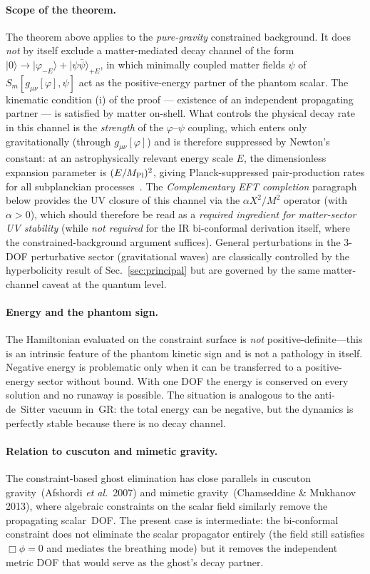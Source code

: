 \documentclass[11pt]{article}
\begin{document}
\paragraph{Scope of the theorem.}
The theorem above applies to the \emph{pure-gravity}
constrained background. It does \emph{not} by itself exclude a
matter-mediated decay channel of the form
$|0\rangle \to |\varphi_{-E}\rangle + |\psi\bar\psi\rangle_{+E}$,
in which minimally coupled matter fields $\psi$ of $S_m[g_{\mu\nu}[\varphi],\psi]$
act as the positive-energy partner of the phantom
scalar. The kinematic condition (i) of the proof --- existence
of an independent propagating partner --- is satisfied by matter
on-shell. What controls the physical decay rate in this channel
is the \emph{strength} of the $\varphi$--$\psi$ coupling, which
enters only gravitationally (through $g_{\mu\nu}[\varphi]$) and is therefore
suppressed by Newton's constant: at an astrophysically relevant
energy scale $E$, the dimensionless expansion parameter is
$(E/M_{\rm Pl})^{2}$, giving Planck-suppressed pair-production
rates for all subplanckian processes~\cite{ArkaniHamed2004}. The
\emph{Complementary EFT completion} paragraph below provides the
UV closure of this channel via the $\alpha X^{2}/M^{2}$ operator
(with $\alpha>0$), which should therefore be read as a
\emph{required ingredient for matter-sector UV stability}
(while \emph{not required} for the IR bi-conformal derivation
itself, where the constrained-background argument suffices).
General perturbations in the 3-DOF perturbative sector
(gravitational waves) are classically controlled by the
hyperbolicity result of Sec.~\ref{sec:principal} but are
governed by the same matter-channel caveat at the quantum
level.

\paragraph{Energy and the phantom sign.}
The Hamiltonian evaluated on the constraint surface is \emph{not} positive-definite---this is an intrinsic feature of the phantom kinetic sign and is not a pathology in itself.  Negative energy is problematic only when it can be transferred to a positive-energy sector without bound.  With one DOF the energy is conserved on every solution and no runaway is possible.  The situation is analogous to the anti-de~Sitter vacuum in~GR: the total energy can be negative, but the dynamics is perfectly stable because there is no decay channel.

\paragraph{Relation to cuscuton and mimetic gravity.}
The constraint-based ghost elimination has close parallels in cuscuton gravity~(Afshordi \textit{et al.}\ 2007) and mimetic gravity~(Chamseddine \& Mukhanov 2013), where algebraic constraints on the scalar field similarly remove the propagating scalar~DOF.  The present case is intermediate: the bi-conformal constraint does not eliminate the scalar propagator entirely (the field still satisfies $\Box\phi=0$ and mediates the breathing mode) but it removes the independent metric DOF that would serve as the ghost's decay partner.
\end{document}
